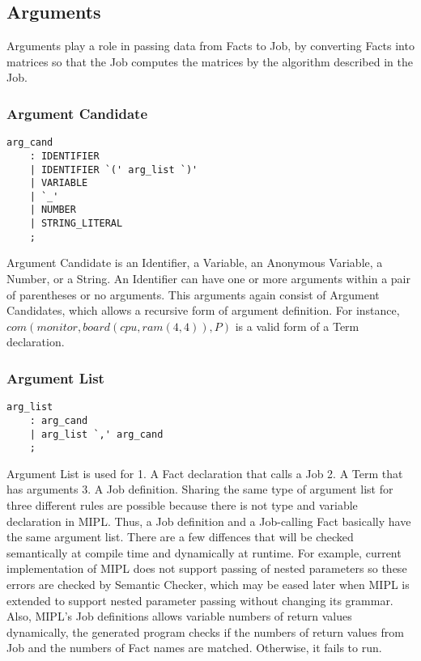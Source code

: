 \documentclass[prodmode,acmtecs]{acmsmall}
\begin{document}
\subsection{Arguments}
Arguments play a role in passing data from Facts to Job, by converting Facts
into matrices so that the Job computes the matrices by the algorithm
described in the Job.

\subsubsection{Argument Candidate}
\begin{lstlisting}
arg_cand
	: IDENTIFIER
	| IDENTIFIER `(' arg_list `)'
	| VARIABLE
	| `_'
	| NUMBER
	| STRING_LITERAL
	;
\end{lstlisting}

Argument Candidate is an Identifier, a Variable, an Anonymous
Variable, a Number, or a String.  An Identifier can have one
or more arguments within a pair of parentheses or no arguments.
This arguments again consist of Argument Candidates, which
allows a recursive form of argument definition.  For instance, 
$com(monitor, board(cpu, ram(4, 4)), P)$ is a valid form
of a Term declaration.

\subsubsection{Argument List}
\begin{lstlisting}
arg_list
	: arg_cand
	| arg_list `,' arg_cand
	;
\end{lstlisting}

Argument List is used for 1. A Fact declaration that calls a Job
2. A Term that has arguments 3. A Job definition.  Sharing the
same type of argument list for three different rules are possible
because there is not type and variable declaration in MIPL.  Thus,
a Job definition and a Job-calling Fact basically have the same
argument list.  There are a few diffences that will be checked
semantically at compile time and dynamically at runtime.  For example,
current implementation of MIPL does not support passing of nested
parameters so these errors are checked by Semantic Checker, which may
be eased later when MIPL is extended to support nested parameter passing
without changing its grammar.  Also, MIPL's Job definitions allows
variable numbers of return values dynamically, the generated program
checks if the numbers of return values from Job and the numbers of
Fact names are matched.  Otherwise, it fails to run.
\end{document}
